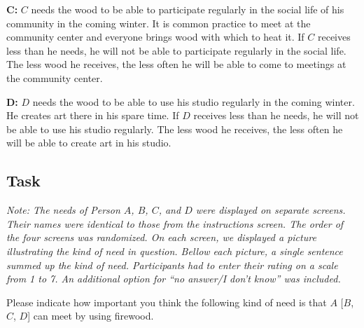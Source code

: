 \documentclass[egregdoesnotlikesansseriftitles]{scrartcl}
\begin{document}
\noindent\textbf{C:} $C$ needs the wood to be able to participate regularly in the social life of his community in the coming winter. %
It is common practice to meet at the community center and everyone brings wood with which to heat it. %
If $C$ receives less than he needs, he will not be able to participate regularly in the social life. %
The less wood he receives, the less often he will be able to come to meetings at the community center.\vspace{2ex} %

\noindent\textbf{D:} $D$ needs the wood to be able to use his studio regularly in the coming winter. %
He creates art there in his spare time. %
If $D$ receives less than he needs, he will not be able to use his studio regularly. %
The less wood he receives, the less often he will be able to create art in his studio.\vspace{2ex} %


\subsection*{Task}
\noindent\textit{Note: The needs of Person $A$, $B$, $C$, and $D$ were displayed on separate screens.
Their names were identical to those from the instructions screen.
The order of the four screens was randomized.
On each screen, we displayed a picture illustrating the kind of need in question.
Bellow each picture, a single sentence summed up the kind of need.
Participants had to enter their rating on a scale from 1 to 7.
An additional option for ``no answer/I don't know'' was included.}\vspace{2ex}

\noindent Please indicate how important you think the following kind of need is that $A$ [$B$, $C$, $D$] can meet by using firewood.\vspace{2ex} %
\end{document}
